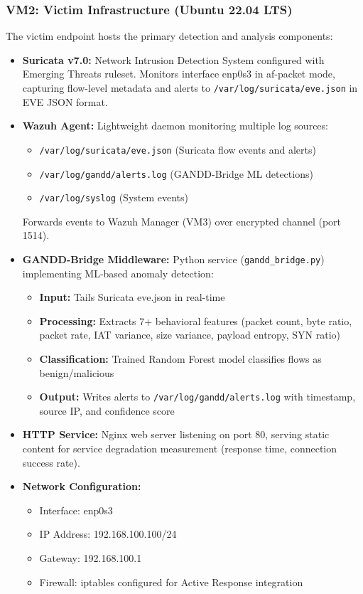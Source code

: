 \subsubsection{VM2: Victim Infrastructure (Ubuntu 22.04 LTS)}

The victim endpoint hosts the primary detection and analysis components:

\begin{itemize}
    \item \textbf{Suricata v7.0:} Network Intrusion Detection System configured with Emerging Threats ruleset. Monitors interface enp0s3 in af-packet mode, capturing flow-level metadata and alerts to \texttt{/var/log/suricata/eve.json} in EVE JSON format.
    
    \item \textbf{Wazuh Agent:} Lightweight daemon monitoring multiple log sources:
    \begin{itemize}
        \item \texttt{/var/log/suricata/eve.json} (Suricata flow events and alerts)
        \item \texttt{/var/log/gandd/alerts.log} (GANDD-Bridge ML detections)
        \item \texttt{/var/log/syslog} (System events)
    \end{itemize}
    Forwards events to Wazuh Manager (VM3) over encrypted channel (port 1514).
    
    \item \textbf{GANDD-Bridge Middleware:} Python service (\texttt{gandd\_bridge.py}) implementing ML-based anomaly detection:
    \begin{itemize}
        \item \textbf{Input:} Tails Suricata eve.json in real-time
        \item \textbf{Processing:} Extracts 7+ behavioral features (packet count, byte ratio, packet rate, IAT variance, size variance, payload entropy, SYN ratio)
        \item \textbf{Classification:} Trained Random Forest model classifies flows as benign/malicious
        \item \textbf{Output:} Writes alerts to \texttt{/var/log/gandd/alerts.log} with timestamp, source IP, and confidence score
    \end{itemize}
    
    \item \textbf{HTTP Service:} Nginx web server listening on port 80, serving static content for service degradation measurement (response time, connection success rate).
    
    \item \textbf{Network Configuration:}
    \begin{itemize}
        \item Interface: enp0s3
        \item IP Address: 192.168.100.100/24
        \item Gateway: 192.168.100.1
        \item Firewall: iptables configured for Active Response integration
    \end{itemize}
\end{itemize}

